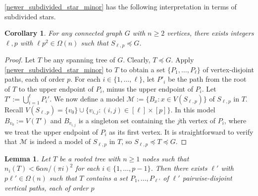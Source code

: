 \documentclass[lotsofwhite]{patmorin}
\renewcommand{\ge}{\geqslant}
\theoremstyle{plain}
\newtheorem{lem}[thm]{Lemma}
\newtheorem{cor}[thm]{Corollary}
\theoremstyle{definition}
\begin{document}
\cref{newer_subdivided_star_minor} has the following interpretation in terms of subdivided stars.

\begin{cor}\label{subdivided_star_minor_ii}
  For any connected graph $G$ with $n\ge 2$ vertices, there exists integers $\ell,p$ with $\ell p^2\in\Omega(n)$ such that $S_{\ell,p}\preceq G$.
\end{cor}

\begin{proof}
  Let $T$ be any spanning tree of $G$. Clearly, $T\preceq G$. Apply \cref{newer_subdivided_star_minor}
  to $T$ to obtain a set $\{P_1,\ldots,P_{\ell}\}$ of vertex-disjoint paths, each of order $p$.  For each $i\in\{1,\ldots,\ell\}$, let $P'_i$ be the path from the root of $T$ to the upper endpoint of $P_i$, minus the upper endpoint of $P_i$.  Let $T':=\bigcup_{i=1}^\ell P_i'$. We now define a model $\mathcal{M}:=\{B_x:x\in V(S_{\ell,p})\}$ of $S_{\ell,p}$ in $T$. Recall $V(S_{\ell,p})=\{v_0\}\cup \{v_{i,j}:(i,j)\in[\ell]\times[p]\}$. In this model $B_{v_0}:=V(T')$ and $B_{v_{i,j}}$ is a singleton set containing the $j$th vertex of $P_i$, where we treat the upper endpoint of $P_i$ as its first vertex. It is straightforward to verify that $\mathcal{M}$ is indeed a model of $S_{\ell,p}$ in $T$, so $S_{\ell,p}\preceq T\preceq G$.
\end{proof}


\begin{lem}
  Let $T$ be a rooted tree with $n\ge 1$ nodes such that $n_i(T)<6\alpha n/(\pi i)^2$ for each $i\in\{1,\ldots,p-1\}$.  Then there exists $\ell'$ with $p\ell'\in \Omega(n)$ such that $T$ contains a set $P_1,\ldots,P_{\ell'}$ of $\ell'$ pairwise-disjoint vertical paths, each of order $p$
\end{lem}
\end{document}
